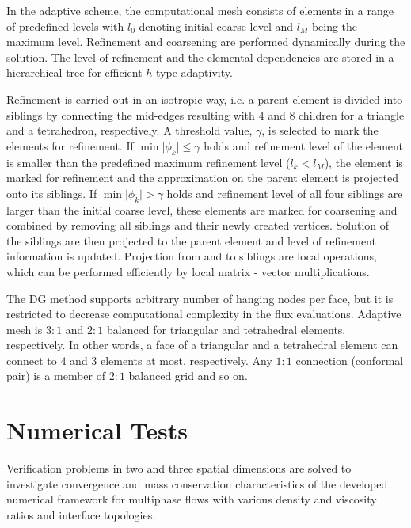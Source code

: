\documentclass[11pt,a4paper,twoside]{article}
\begin{document}
	In the adaptive scheme, the computational mesh consists of elements in a range of predefined levels with $ l_0 $ denoting initial coarse level and $ l_{M} $ being the maximum level. Refinement and coarsening  are performed dynamically during the solution. The level of refinement and the elemental dependencies are stored in a hierarchical tree for efficient $h$ type adaptivity.
	
	Refinement is carried out in an isotropic way, i.e. a parent element is divided into siblings  by connecting the mid-edges resulting with $ 4 $ and $ 8 $ children for a triangle and a tetrahedron, respectively. A threshold value, $ \gamma $, is selected  to mark the elements for refinement. If $\min \vert \phi_k \rvert \leqslant \gamma  $ holds and  refinement level of the element is smaller than the predefined maximum refinement level ($ l_{k} <  l_{M} $), the element is marked for refinement and the approximation on the parent element is projected onto its siblings.  If $\min\vert \phi_k \rvert > \gamma  $ holds and refinement level of all four siblings are larger than the initial coarse level, these elements are marked for coarsening and combined by removing all siblings and their newly created vertices. Solution of the siblings are then projected to the parent element and level of refinement information is updated. Projection from and to siblings are local operations, which can be performed efficiently  by local matrix - vector multiplications.   
	
	The DG method supports arbitrary number of hanging nodes per face, but it is restricted to decrease  computational complexity in the flux evaluations. Adaptive mesh is $ 3:1 $ and $ 2:1 $ balanced for  triangular  and tetrahedral elements, respectively. In other words, a face of a triangular and a tetrahedral element can connect to $ 4 $ and $ 3 $ elements at most, respectively. Any $ 1:1 $ connection (conformal pair) is a member of $ 2:1 $ balanced grid and so on.  
	
	
	
	\section{Numerical Tests}
	\label{Sec.Numerical_Tests}
	Verification problems in two and three spatial dimensions are solved to investigate convergence and mass conservation characteristics of the developed numerical framework for multiphase flows with various density and viscosity ratios and interface topologies.
	
\end{document}
